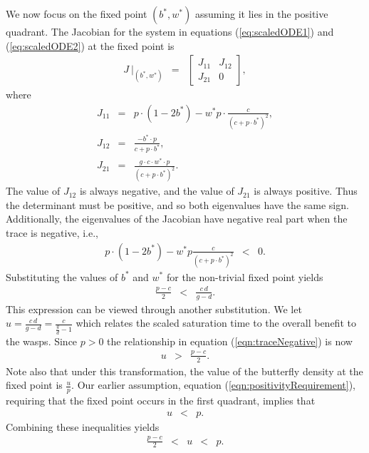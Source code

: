 \documentclass[review,authoryear]{elsarticle}
\begin{document}
We now focus on the fixed point $(b^*,w^*)$ assuming it lies in the positive quadrant.
The Jacobian for the system in equations (\ref{eq:scaledODE1}) and
(\ref{eq:scaledODE2}) at the fixed point is
\begin{eqnarray}
  J ~ \bigg|_{(b^*,w^*)} & = &
          \left[
          \begin{array}{rr}
            J_{11} & J_{12} \\
            J_{21} & 0
          \end{array}
          \right],
\end{eqnarray}
where
\begin{eqnarray}
  \label{eq:jacobian}
  J_{11} & = & p\cdot (1-2b^*) - w^* p\cdot \frac{c}{(c+p\cdot b^*)^2}, \\
  J_{12} & = & \frac{-b^*\cdot p}{c+p\cdot b^*}, \\
  J_{21} & = & \frac{g\cdot c \cdot w^* \cdot p}{(c+p\cdot b^*)^2}.
\end{eqnarray}
The value of $J_{12}$ is always negative, and the value of $J_{21}$ is always positive. Thus the determinant must be positive, and so both eigenvalues have the same sign.
Additionally, the eigenvalues of the Jacobian have negative real part when the
trace is negative, i.e.,
\begin{eqnarray}
  p\cdot (1-2b^*) - w^* p\frac{c}{(c+p\cdot b^*)^2} & < & 0.
\end{eqnarray}
Substituting the values of $b^*$ and $w^*$ for the non-trivial fixed point
yields
\begin{eqnarray}
  \label{eqn:traceNegative}
  \frac{p-c}{2} & < & \frac{c\,d}{g-d}.
\end{eqnarray}
This expression can be viewed through another substitution. We let
$u=\frac{c\,d}{g-d}=\frac{c}{\frac{g}{d}-1}$ which relates the scaled saturation time to the overall benefit to the wasps.   Since
$p>0$ the relationship in equation
(\ref{eqn:traceNegative}) is now
\begin{eqnarray}
  \label{eq:stabilityParameters}
  u & > & \frac{p-c}{2}.
\end{eqnarray}
Note also that under this transformation, the value of the butterfly
density at the fixed point is $\frac{u}{p}$. Our earlier assumption, equation (\ref{eqn:positivityRequirement}), requiring that the fixed point occurs in the first quadrant,  implies that
\begin{eqnarray}
  \label{eq:boundFixedPoint}
  u & < & p.
\end{eqnarray}
Combining these inequalities yields
\begin{equation}
  \begin{array}{rcccl}
  \frac{p-c}{2}  & <  & u  & < & p.
  \end{array}
\end{equation}
\end{document}
